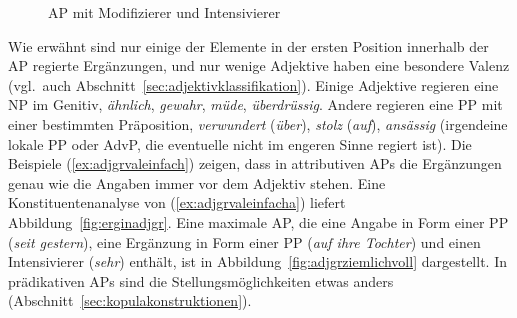 \begin{exe}
  \ex\label{ex:adjgrnormal}
  \begin{xlist}
  \end{xlist}
\end{exe}

\begin{figure}
  \centering
  \caption{AP mit Modifizierer und Intensivierer}
  \label{fig:adgrnormalana}
\end{figure}

Wie erwähnt sind nur einige der Elemente in der ersten Position innerhalb der AP regierte Ergänzungen, und
nur wenige Adjektive haben eine besondere Valenz (vgl.\ auch Abschnitt~\ref{sec:adjektivklassifikation}).
Einige Adjektive regieren eine NP im Genitiv, \zB \textit{ähnlich}, \textit{gewahr}, \textit{müde}, \textit{überdrüssig}.
Andere regieren eine PP mit einer bestimmten Präposition, \zB \textit{verwundert} (\textit{über}), \textit{stolz} (\textit{auf}), \textit{ansässig} (irgendeine lokale PP oder AdvP, die eventuelle nicht im engeren Sinne regiert ist).
Die Beispiele (\ref{ex:adjgrvaleinfach}) zeigen, dass in attributiven APs die Ergänzungen genau wie die Angaben immer vor dem Adjektiv stehen.
Eine Konstituentenanalyse von (\ref{ex:adjgrvaleinfacha}) liefert Abbildung~\ref{fig:erginadjgr}.
Eine maximale AP, die eine Angabe in Form einer PP (\textit{seit gestern}), eine Ergänzung in Form einer PP (\textit{auf ihre Tochter}) und einen Intensivierer (\textit{sehr}) enthält, ist in Abbildung~\ref{fig:adjgrziemlichvoll} dargestellt.
In prädikativen APs sind die Stellungsmöglichkeiten etwas anders (Abschnitt~\ref{sec:kopulakonstruktionen}).

\begin{exe}
  \ex\label{ex:adjgrvaleinfach}
  \begin{xlist}
  \end{xlist}
\end{exe}

